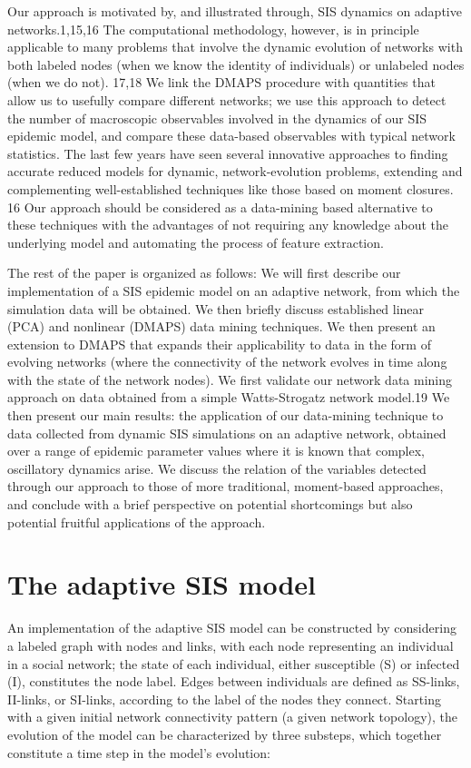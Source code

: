 Our approach is motivated by, and illustrated through, SIS dynamics on
adaptive networks.1,15,16 The computational methodology, however, is
in principle applicable to many problems that involve the dynamic
evolution of networks with both labeled nodes (when we know the
identity of individuals) or unlabeled nodes (when we do not). 17,18 We
link the DMAPS procedure with quantities that allow us to usefully
compare different networks; we use this approach to detect the number
of macroscopic observables involved in the dynamics of our SIS
epidemic model, and compare these data-based observables with typical
network statistics. The last few years have seen several innovative
approaches to finding accurate reduced models for dynamic,
network-evolution problems, extending and complementing
well-established techniques like those based on moment closures. 16
Our approach should be considered as a data-mining based alternative
to these techniques with the advantages of not requiring any knowledge
about the underlying model and automating the process of feature
extraction.

The rest of the paper is organized as follows: We will first describe
our implementation of a SIS epidemic model on an adaptive network,
from which the simulation data will be obtained. We then briefly
discuss established linear (PCA) and nonlinear (DMAPS) data mining
techniques. We then present an extension to DMAPS that expands their
applicability to data in the form of evolving networks (where the
connectivity of the network evolves in time along with the state of
the network nodes). We first validate our network data mining approach
on data obtained from a simple Watts-Strogatz network model.19 We then
present our main results: the application of our data-mining technique
to data collected from dynamic SIS simulations on an adaptive network,
obtained over a range of epidemic parameter values where it is known
that complex, oscillatory dynamics arise. We discuss the relation of
the variables detected through our approach to those of more
traditional, moment-based approaches, and conclude with a brief
perspective on potential shortcomings but also potential fruitful
applications of the approach.

\section{The adaptive SIS model}

An implementation of the adaptive SIS model can be constructed by
considering a labeled graph with nodes and links, with each node
representing an individual in a social network; the state of each
individual, either susceptible (S) or infected (I), constitutes the
node label. Edges between individuals are defined as SS-links,
II-links, or SI-links, according to the label of the nodes they
connect. Starting with a given initial network connectivity pattern (a
given network topology), the evolution of the model can be
characterized by three substeps, which together constitute a time step
in the model's evolution:

